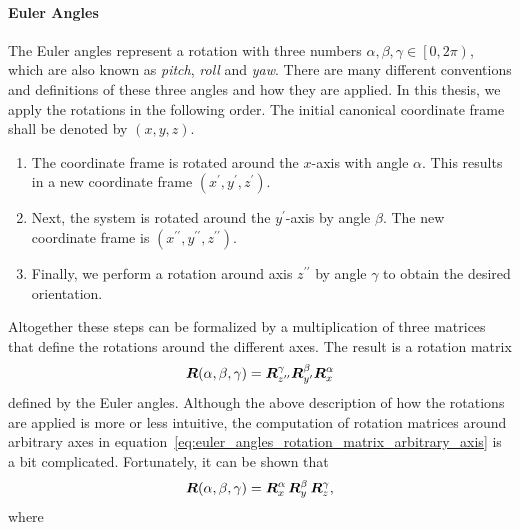		\paragraph{Euler Angles}
		The Euler angles represent a rotation with three numbers 
		$\alpha, \beta, \gamma \in \left[0, 2\pi\right)$, which are also known as \emph{pitch}, \emph{roll} and \emph{yaw}.
		There are many different conventions and definitions of these three angles and how they are applied.
		In this thesis, we apply the rotations in the following order. 
		The initial canonical coordinate frame shall be denoted by $(x, y, z)$.
		\begin{enumerate}
			\item The coordinate frame is rotated around the $x$-axis with angle $\alpha$. 
			This results in a new coordinate frame $(x^\prime, y^\prime, z^\prime)$.
			\item Next, the system is rotated around the $y^\prime$-axis by angle $\beta$. 
			The new coordinate frame is $(x^{\prime\prime}, y^{\prime\prime}, z^{\prime\prime})$.
			\item Finally, we perform a rotation around axis $z^{\prime\prime}$ by angle $\gamma$ to obtain the desired orientation.
		\end{enumerate}
		Altogether these steps can be formalized by a multiplication of three matrices that define the rotations around the different axes. 
		The result is a rotation matrix
		\begin{equation}\label{eq:euler_angles_rotation_matrix_arbitrary_axis}
			\bm{R}(\alpha, \beta, \gamma) =
			\bm{R}_{z^{\prime\prime}}^\gamma
			\bm{R}_{y^\prime}^\beta
			\bm{R}_{x}^\alpha
		\end{equation}
		defined by the Euler angles. 
		Although the above description of how the rotations are applied is more or less intuitive, the computation of rotation matrices around arbitrary axes in equation~\ref{eq:euler_angles_rotation_matrix_arbitrary_axis} is a bit complicated.
		Fortunately, it can be shown that 
		\begin{equation}\label{eq:euler_angles_rotation_matrix_global_axis}
			\bm{R}(\alpha, \beta, \gamma) =
			\bm{R}_{x}^\alpha \,
			\bm{R}_{y}^\beta \,
			\bm{R}_{z}^\gamma,
		\end{equation}
		where 
